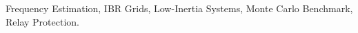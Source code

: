 ﻿\begin{IEEEkeywords}
Frequency Estimation, IBR Grids, Low-Inertia Systems, Monte Carlo Benchmark, Relay Protection.
\end{IEEEkeywords}
